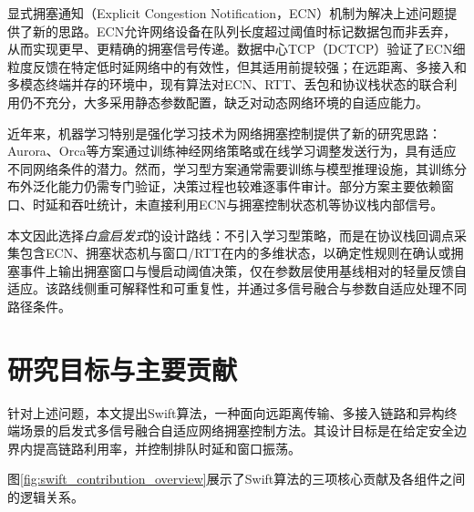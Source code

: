 显式拥塞通知（Explicit Congestion Notification，ECN）机制为解决上述问题提供了新的思路。ECN允许网络设备在队列长度超过阈值时标记数据包而非丢弃，从而实现更早、更精确的拥塞信号传递。数据中心TCP（DCTCP）验证了ECN细粒度反馈在特定低时延网络中的有效性，但其适用前提较强；在远距离、多接入和多模态终端并存的环境中，现有算法对ECN、RTT、丢包和协议栈状态的联合利用仍不充分，大多采用静态参数配置，缺乏对动态网络环境的自适应能力。

近年来，机器学习特别是强化学习技术为网络拥塞控制提供了新的研究思路：Aurora、Orca等方案通过训练神经网络策略或在线学习调整发送行为，具有适应不同网络条件的潜力。然而，学习型方案通常需要训练与模型推理设施，其训练分布外泛化能力仍需专门验证，决策过程也较难逐事件审计。部分方案主要依赖窗口、时延和吞吐统计，未直接利用ECN与拥塞控制状态机等协议栈内部信号。

本文因此选择\emph{白盒启发式}的设计路线：不引入学习型策略，而是在协议栈回调点采集包含ECN、拥塞状态机与窗口/RTT在内的多维状态，以确定性规则在确认或拥塞事件上输出拥塞窗口与慢启动阈值决策，仅在参数层使用基线相对的轻量反馈自适应。该路线侧重可解释性和可重复性，并通过多信号融合与参数自适应处理不同路径条件。

\section{研究目标与主要贡献}

针对上述问题，本文提出Swift算法，一种面向远距离传输、多接入链路和异构终端场景的启发式多信号融合自适应网络拥塞控制方法。其设计目标是在给定安全边界内提高链路利用率，并控制排队时延和窗口振荡。

图\ref{fig:swift_contribution_overview}展示了Swift算法的三项核心贡献及各组件之间的逻辑关系。

